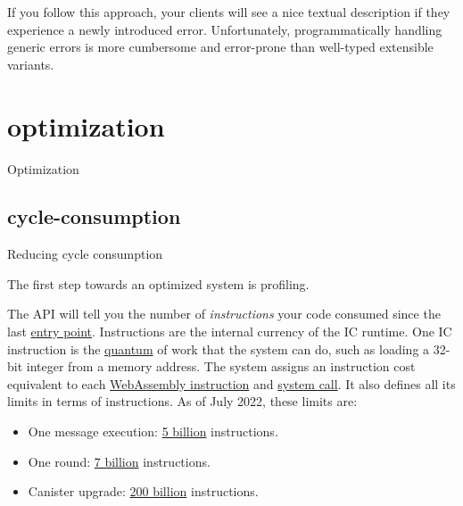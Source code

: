 \documentclass{article}
\begin{document}
If you follow this approach, your clients will see a nice textual description if they experience a newly introduced error.
Unfortunately, programmatically handling generic errors is more cumbersome and error-prone than well-typed extensible variants.

\section{optimization}{Optimization}
\subsection{cycle-consumption}{Reducing cycle consumption}

The first step towards an optimized system is profiling.


The \href{https://docs.rs/ic-cdk/0.5.3/ic_cdk/api/fn.instruction_counter.html}{} API will tell you the number of \emph{instructions} your code consumed since the last \href{https://internetcomputer.org/docs/current/references/ic-interface-spec/#entry-points}{entry point}.
Instructions are the internal currency of the IC runtime.
One IC instruction is the \href{https://en.wikipedia.org/wiki/Quantum}{quantum} of work that the system can do, such as loading a 32-bit integer from a memory address.
The system assigns an instruction cost equivalent to each \href{https://sourcegraph.com/github.com/dfinity/ic@cfdbbf5fb5fdbc8f483dfd3a5f7f627b752d3156/-/blob/rs/embedders/src/wasm_utils/instrumentation.rs?L155-177}{WebAssembly instruction} and \href{https://sourcegraph.com/github.com/dfinity/ic@cfdbbf5/-/blob/rs/embedders/src/wasmtime_embedder/system_api_complexity.rs?L40-107}{system call}.
It also defines all its limits in terms of instructions.
As of July 2022, these limits are:

\begin{itemize}
\item One message execution: \href{https://github.com/dfinity/ic/blob/7d3fb4ef01416241205818450156aabd21c24b34/rs/config/src/subnet_config.rs#L19}{5 billion} instructions.
\item One round: \href{https://github.com/dfinity/ic/blob/7d3fb4ef01416241205818450156aabd21c24b34/rs/config/src/subnet_config.rs#L46}{7 billion} instructions.
\item Canister upgrade: \href{https://github.com/dfinity/ic/blob/7d3fb4ef01416241205818450156aabd21c24b34/rs/config/src/subnet_config.rs#L56}{200 billion} instructions.
\end{itemize}
\end{document}
